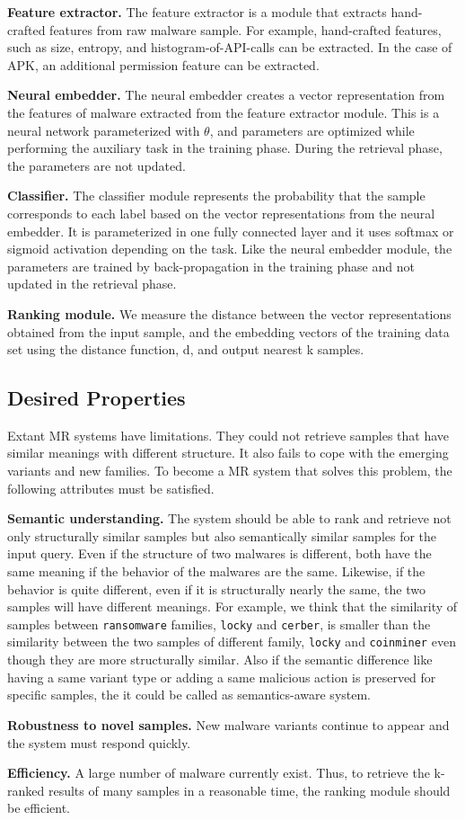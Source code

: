 \textbf{Feature extractor. }
The feature extractor is a module that extracts hand-crafted features from raw malware sample. For example, hand-crafted features, such as size, entropy, and histogram-of-API-calls can be extracted. In the case of APK, an additional permission feature can be extracted. 

\textbf{Neural embedder. }
The neural embedder creates a vector representation from the features of malware extracted from the feature extractor module. This is a neural network parameterized with $\theta$, and parameters are optimized while performing the auxiliary task in the training phase. During the retrieval phase, the parameters are not updated. 

\textbf{Classifier. }
The classifier module represents the probability that the sample corresponds to each label based on the vector representations from the neural embedder. It is parameterized in one fully connected layer and it uses softmax or sigmoid activation depending on the task. Like the neural embedder module, the parameters are trained by back-propagation in the training phase and not updated in the retrieval phase.

\textbf{Ranking module. }
We measure the distance between the vector representations obtained from the input sample, and the embedding vectors of the training data set using the distance function, d, and output nearest k samples.


\subsection{Desired Properties}
Extant MR systems have limitations. They could not retrieve samples that have similar meanings with different structure. It also fails to cope with the emerging variants and new families. To become a MR system that solves this problem, the following attributes must be satisfied.

\textbf{Semantic understanding. }
The system should be able to rank and retrieve not only structurally similar samples but also semantically similar samples for the input query. Even if the structure of two malwares is different, both have the same meaning if the behavior of the malwares are the same. Likewise, if the behavior is quite different, even if it is structurally nearly the same, the two samples will have different meanings. For example, we think that the similarity of samples between \texttt{ransomware} families, \texttt{locky} and \texttt{cerber}, is smaller than the similarity between the two samples of different family, \texttt{locky} and \texttt{coinminer} even though they are more structurally similar. Also if the semantic difference like having a same variant type or adding a same malicious action is preserved for specific samples, the it could be called as semantics-aware system.
 
\textbf{Robustness to novel samples. }
New malware variants continue to appear and the system must respond quickly.

\textbf{Efficiency. }
A large number of malware currently exist. Thus, to retrieve the k-ranked results of many samples in a reasonable time, the ranking module should be efficient.


